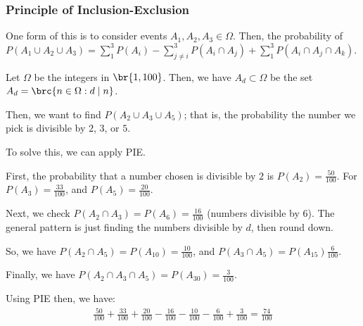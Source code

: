\documentclass[openany]{book}
\begin{document}
\subsubsection{Principle of Inclusion-Exclusion}
One form of this is to consider events $A_1, A_2, A_3 \in \Omega$. Then, the probability of $P(A_1 \cup A_2 \cup A_3) = \sum_1^{3} P(A_i) - \sum_{j\neq i}^{3} P(A_i \cap A_j) + \sum_1^{3} P(A_i \cap A_j \cap A_k)$.

\begin{example}
	Let $\Omega$ be the integers in $\br{1, 100}$. Then, we have $A_d \subset \Omega$ be the set $A_d = \brc{n \in \Omega : d \mid n}$.
	
	Then, we want to find $P(A_2 \cup A_3 \cup A_5)$; that is, the probability the number we pick is divisible by $2$, $3$, or $5$.
	
	To solve this, we can apply PIE.
	
	First, the probability that a number chosen is divisible by $2$ is $P(A_2) = \frac{50}{100}$. For $P(A_3) = \frac{33}{100}$, and $P(A_5) = \frac{20}{100}$.
	
	Next, we check $P(A_2 \cap A_3) = P(A_6) = \frac{16}{100}$ (numbers divisible by $6$). The general pattern is just finding the numbers divisible by $d$, then round down.
	
	So, we have $P(A_2 \cap A_5) = P(A_{10}) = \frac{10}{100}$, and $P(A_3 \cap A_5) = P(A_{15})\frac{6}{100}$.
	
	Finally, we have $P(A_2 \cap A_3 \cap A_5) = P(A_{30}) = \frac{3}{100}$.
	
	Using PIE then, we have:
	\begin{align*}
		\frac{50}{100} + \frac{33}{100} + \frac{20}{100} - \frac{16}{100} - \frac{10}{100} - \frac{6}{100} + \frac{3}{100} = \frac{74}{100}
	\end{align*}
\end{example}
\end{document}
